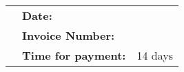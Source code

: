 \documentclass[onecolumn]{article} %
\begin{document}
\vspace{2cm}


\begin{multicols}{3}
\begin{flushleft}
\invoiceecompanyname\\
\invoiceefullname\\
\invoiceestreet\\
\invoiceezipcode~\invoiceecity\\
\invoiceecountry\\
\end{flushleft}


\columnbreak
\begin{flushleft}
\vfill
\end{flushleft}
\vspace{2cm}

\columnbreak
\begin{flushleft}
\vspace*{1cm}
\myfullname\\
\mystreet\\
\myzipcode~\mycity\\
\myphone\\

\ifx\mywebsite\undefined
\else
\href{\mywebsite}{\mywebsite}\\
\fi
\href{\myemail}{\myemail}\\
\end{flushleft}

\end{multicols}

\begin{flushright}
	\begin{longtable}{p{10cm}lr}
		\hfill & \textbf{Date:} & \invoicedate\\
		\hfill & \textbf{Invoice Number:} & \invoicenumber\\
		\hfill & \textbf{Time for payment:} & 14 days\\
	\end{longtable}
\end{flushright}
\end{document}
